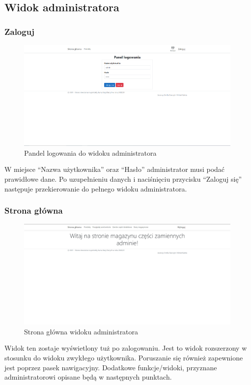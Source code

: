 \documentclass{article}
\begin{document}
\subsection{Widok administratora}
\subsubsection{Zaloguj}
\begin{figure}[H]
   \centering
   \includegraphics[width=0.99\textwidth,frame]{Wyglad/logowanie_admin.png}
   \caption{Pandel logowania do widoku administratora}
\end{figure}
W miejsce ``Nazwa użytkownika'' oraz ``Hasło'' administrator musi podać prawidłowe dane. Po uzupełnieniu
danych i naciśnięciu przycisku ``Zaloguj się'' następuje przekierowanie do pełnego widoku administratora.

\subsubsection{Strona główna}
\begin{figure}[H]
   \centering
   \includegraphics[width=0.99\textwidth,frame]{Wyglad/powitanie_admin.png}
   \caption{Strona główna widoku administratora}
\end{figure}
Widok ten zostaje wyświetlony tuż po zalogowaniu. Jest to widok rozszerzony w stosunku do widoku
zwykłego użytkownika. Poruszanie się również zapewnione jest poprzez pasek nawigacyjny. Dodatkowe
funkcje/widoki, przyznane administratorowi opisane będą w następnych punktach.
\end{document}

